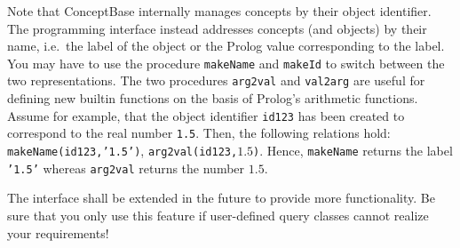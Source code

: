 Note that ConceptBase internally manages concepts by their object identifier. The
programming interface instead addresses concepts (and objects) by their name, i.e.\ 
the label of the object or the Prolog value corresponding to the label.
You may have to use the procedure {\tt makeName} and {\tt makeId} to switch between
the two representations. The two 
procedures {\tt arg2val} and {\tt val2arg} are useful for defining new builtin
functions on the basis of Prolog's arithmetic functions.
Assume for example, that the object identifier {\tt id123} has been created to correspond to
the real number {\tt 1.5}. Then, the following relations hold: {\tt makeName(id123,'1.5')},
{\tt arg2val(id123,}$1.5${\tt)}. Hence, {\tt makeName} returns the label {\tt '1.5'} whereas
{\tt arg2val} returns the number $1.5$.

The interface shall be extended in the future to provide more functionality.
Be sure that you only use this feature if user-defined query classes cannot
realize your requirements!






